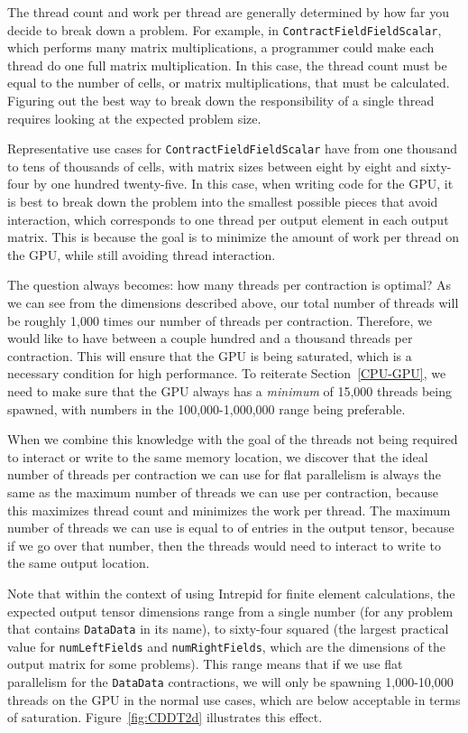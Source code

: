 The thread count and work per thread are generally determined by how far you
decide to break down a problem. For example, in
\texttt{ContractFieldFieldScalar}, which performs many matrix multiplications, a
programmer could make each thread do one full matrix multiplication. In this
case, the thread count must be equal to the number of cells, or matrix
multiplications, that must be calculated. Figuring out the best way to break
down the responsibility of a single thread requires looking at the expected
problem size. 

Representative use cases for \texttt{ContractFieldFieldScalar}
have from one thousand to tens of thousands of cells, with matrix sizes between
eight by eight and sixty-four by one hundred twenty-five. In this case, when
writing code for the GPU, it is best to break down the problem into the smallest
possible pieces that avoid interaction, which corresponds to one thread per
output element in each output matrix. This is because the goal is to minimize
the amount of work per thread on the GPU, while still avoiding thread
interaction. 

The question always becomes: how many threads per contraction is optimal?  As we
can see from the dimensions described above, our total number of threads will be
roughly 1,000 times our number of threads per contraction. Therefore, we would
like to have between a couple hundred and a thousand threads per contraction.
This will ensure that the GPU is being saturated, which is a necessary condition
for high performance.  To reiterate Section~\ref{CPU-GPU}, we need to make sure
that the GPU always has a \emph{minimum} of 15,000 threads being spawned, with
numbers in the 100,000-1,000,000 range being preferable.

When we combine this knowledge with the goal of the threads not being required
to interact or write to the same memory location, we discover that the ideal
number of threads per contraction we can use for flat parallelism is always the
same as the maximum number of threads we can use per contraction, because this
maximizes thread count and minimizes the work per thread.  The maximum number of
threads we can use is equal to of entries in the output tensor, because if we go
over that number, then the threads would need to interact to write to the same
output location.

Note that within the context of using Intrepid for finite element calculations,
the expected output tensor dimensions range from a single number (for any
problem that contains \texttt{DataData} in its name), to sixty-four squared (the
largest practical value for \texttt{numLeftFields} and \texttt{numRightFields},
which are the dimensions of the output matrix for some problems). This range
means that if we use flat parallelism for the \texttt{DataData} contractions, we
will only be spawning 1,000-10,000 threads on the GPU in the normal use cases,
which are below acceptable in terms of saturation.  Figure~\ref{fig:CDDT2d}
illustrates this effect.

